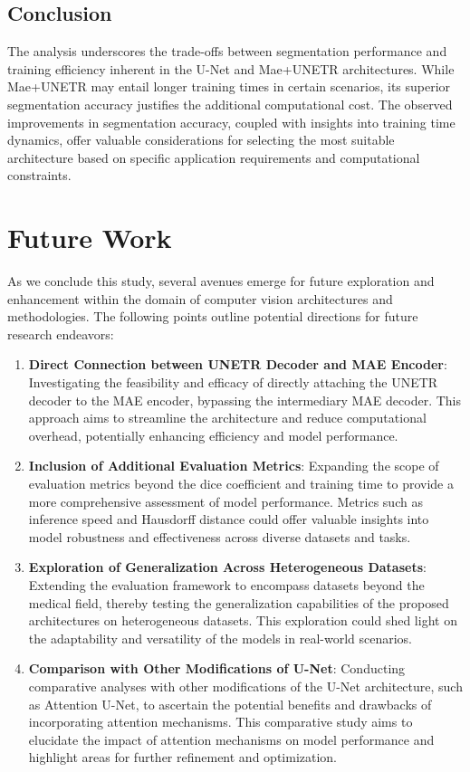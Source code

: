 \subsection{Conclusion}
The analysis underscores the trade-offs between segmentation performance and training efficiency inherent in the U-Net and Mae+UNETR architectures. While Mae+UNETR may entail longer training times in certain scenarios, its superior segmentation accuracy justifies the additional computational cost. The observed improvements in segmentation accuracy, coupled with insights into training time dynamics, offer valuable considerations for selecting the most suitable architecture based on specific application requirements and computational constraints.


\section{Future Work}
As we conclude this study, several avenues emerge for future exploration and enhancement within the domain of computer vision architectures and methodologies. The following points outline potential directions for future research endeavors:
\begin{enumerate}
    \item \textbf{Direct Connection between UNETR Decoder and MAE Encoder}: Investigating the feasibility and efficacy of directly attaching the UNETR decoder to the MAE encoder, bypassing the intermediary MAE decoder. This approach aims to streamline the architecture and reduce computational overhead, potentially enhancing efficiency and model performance.
    \item \textbf{Inclusion of Additional Evaluation Metrics}: Expanding the scope of evaluation metrics beyond the dice coefficient and training time to provide a more comprehensive assessment of model performance. Metrics such as inference speed and Hausdorff distance could offer valuable insights into model robustness and effectiveness across diverse datasets and tasks.
    \item \textbf{Exploration of Generalization Across Heterogeneous Datasets}: Extending the evaluation framework to encompass datasets beyond the medical field, thereby testing the generalization capabilities of the proposed architectures on heterogeneous datasets. This exploration could shed light on the adaptability and versatility of the models in real-world scenarios.
    \item \textbf{Comparison with Other Modifications of U-Net}: Conducting comparative analyses with other modifications of the U-Net architecture, such as Attention U-Net, to ascertain the potential benefits and drawbacks of incorporating attention mechanisms. This comparative study aims to elucidate the impact of attention mechanisms on model performance and highlight areas for further refinement and optimization.
\end{enumerate}

